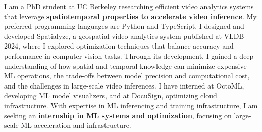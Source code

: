 \cvsummarysection


\begin{cvparagraph}

I am a PhD student at UC Berkeley researching efficient video analytics systems that leverage {\bf spatiotemporal properties to accelerate video inference}.
My preferred programming languages are Python and TypeScript.
I designed and developed Spatialyze, a geospatial video analytics system published at VLDB 2024, where I explored optimization techniques that balance accuracy and performance in computer vision tasks.
Through its development, I gained a deep understanding of how spatial and temporal knowledge can minimize expensive ML operations, the trade-offs between model precision and computational cost, and the challenges in large-scale video inferences.
I have interned at OctoML, developing ML model visualizers, and at DocuSign, optimizing cloud infrastructure.
With expertise in ML inferencing and training infrastructure, I am seeking an {\bf internship in ML systems and optimization}, focusing on large-scale ML acceleration and infrastructure.
\end{cvparagraph}
\vspace{-1mm}

